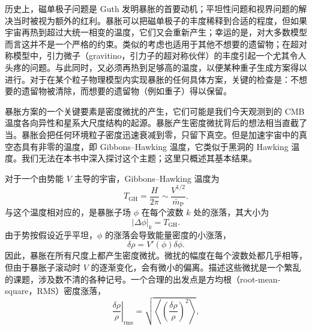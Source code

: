 历史上，磁单极子问题是 Guth 发明暴胀的首要动机；平坦性问题和视界问题的解决当时被视为额外的红利。暴胀可以把磁单极子的丰度稀释到合适的程度，但如果宇宙再热到超过大统一相变的温度，它们又会重新产生；幸运的是，对大多数模型而言这并不是一个严格的约束。类似的考虑也适用于其他不想要的遗留物；在超对称模型中，引力微子（gravitino，引力子的超对称伙伴）的丰度引起一个尤其令人头疼的问题。与此同时，又必须再热到足够高的温度，以便某种重子生成方案得以进行。对于在某个粒子物理模型内实现暴胀的任何具体方案，关键的检查是：不想要的遗留物被清除，而想要的遗留物（例如重子）得以保留。

暴胀方案的一个关键要素是密度微扰的产生，它们可能是我们今天观测到的 CMB 温度各向异性和星系大尺度结构的起源。暴胀产生密度微扰背后的想法相当直截了当。暴胀会把任何环境粒子密度迅速衰减到零，只留下真空。但是加速宇宙中的真空态具有非零的温度，即 Gibbons--Hawking 温度，它类似于黑洞的 Hawking 温度。我们无法在本书中深入探讨这个主题；这里只概述其基本结果。

对于一个由势能 $V$ 主导的宇宙，Gibbons--Hawking 温度为
\begin{equation*}
T_{\mathrm{GH}} = \frac{H}{2\pi} \sim \frac{V^{1/2}}{\bar{m}_{\mathrm{P}}}.
\tag{8.197}
\end{equation*}
与这个温度相对应的，是暴胀子场 $\phi$ 在每个波数 $k$ 处的涨落，其大小为
\begin{equation*}
|\Delta\phi|_{k} = T_{\mathrm{GH}}.
\tag{8.198}
\end{equation*}
由于势按假设近乎平坦，$\phi$ 的涨落会导致能量密度的小涨落，
\begin{equation*}
\delta\rho = V'(\phi)\delta\phi.
\tag{8.199}
\end{equation*}
因此，暴胀在所有尺度上都产生密度微扰。微扰的幅度在每个波数处都几乎相等，但由于暴胀子滚动时 $V$ 的逐渐变化，会有微小的偏离。描述这些微扰是一个繁乱的课题，涉及数不清的各种记号。一个合理的出发点是方均根（root-mean-square，RMS）密度涨落，
\begin{equation*}
\left.\frac{\delta\rho}{\rho}\right|_{\mathrm{rms}} = \sqrt{\left\langle\left(\frac{\delta\rho}{\rho}\right)^{2}\right\rangle},
\tag{8.200}
\end{equation*}

